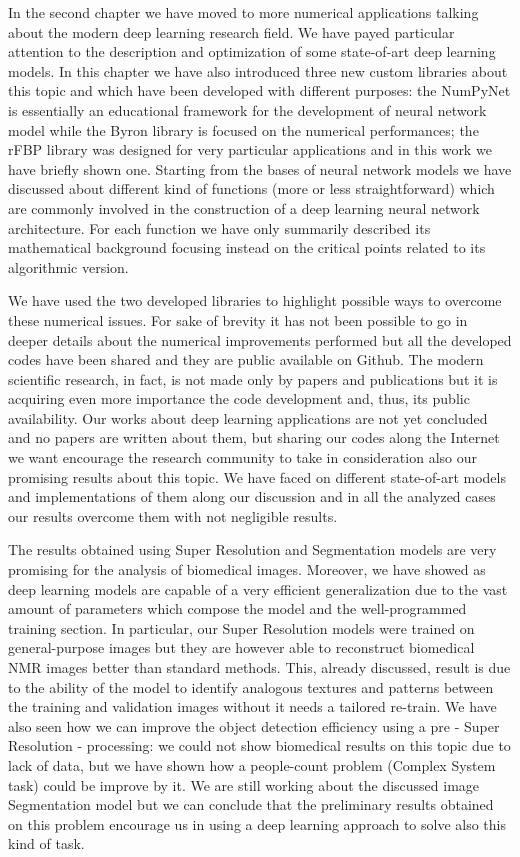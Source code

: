 \documentclass{standalone}
\begin{document}
In the second chapter we have moved to more numerical applications talking about the modern deep learning research field.
We have payed particular attention to the description and optimization of some state-of-art deep learning models.
In this chapter we have also introduced three new custom libraries about this topic and which have been developed with different purposes: the \textsf{NumPyNet} is essentially an educational framework for the development of neural network model while the \textsf{Byron} library is focused on the numerical performances; the \textsf{rFBP} library was designed for very particular applications and in this work we have briefly shown one.
Starting from the bases of neural network models we have discussed about different kind of functions (more or less straightforward) which are commonly involved in the construction of a deep learning neural network architecture.
For each function we have only summarily described its mathematical background focusing instead on the critical points related to its algorithmic version.

We have used the two developed libraries to highlight possible ways to overcome these numerical issues.
For sake of brevity it has not been possible to go in deeper details about the numerical improvements performed but all the developed codes have been shared and they are public available on Github.
The modern scientific research, in fact, is not made only by papers and publications but it is acquiring even more importance the code development and, thus, its public availability.
Our works about deep learning applications are not yet concluded and no papers are written about them, but sharing our codes along the Internet we want encourage the research community to take in consideration also our promising results about this topic.
We have faced on different state-of-art models and implementations of them along our discussion and in all the analyzed cases our results overcome them with not negligible results.

The results obtained using Super Resolution and Segmentation models are very promising for the analysis of biomedical images.
Moreover, we have showed as deep learning models are capable of a very efficient generalization due to the vast amount of parameters which compose the model and the well-programmed training section.
In particular, our Super Resolution models were trained on general-purpose images but they are however able to reconstruct biomedical NMR images better than standard methods.
This, already discussed, result is due to the ability of the model to identify analogous textures and patterns between the training and validation images without it needs a tailored re-train.
We have also seen how we can improve the object detection efficiency using a pre - Super Resolution - processing: we could not show biomedical results on this topic due to lack of data, but we have shown how a people-count problem (Complex System task) could be improve by it.
We are still working about the discussed image Segmentation model but we can conclude that the preliminary results obtained on this problem encourage us in using a deep learning approach to solve also this kind of task.
\end{document}
